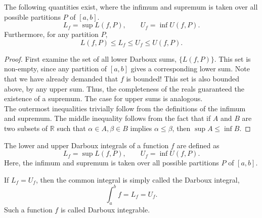 \documentclass[11pt]{article}
\def\R{\mathbb{R}}
\theoremstyle{definition}
\theoremstyle{remark}
\numberwithin{equation}{module}
\begin{document}
    \begin{corollary}
        The following quantities exist, where the infimum and supremum is taken over
        all possible partitions $P$ of $[a, b]$. \[
            L_f = \sup L(f, P), \qquad U_f = \inf U(f, P).
        \] Furthermore, for any partition $P$, \[
            L(f, P) \leq L_f \leq U_f \leq U(f, P).
        \] 
    \end{corollary}
    \begin{proof}
        First examine the set of all lower Darboux sums, $\{L(f, P)\}$. This set is
        non-empty, since any partition of $[a, b]$ gives a corresponding lower sum.
        Note that we have already demanded that $f$ is bounded!
        This set is also bounded above, by any upper sum. Thus, the completeness of
        the reals guaranteed the existence of a supremum. The case for upper sums is
        analogous. \\

        \noindent The outermost inequalities trivially follow from the definitions
        of the infimum and supremum. The middle inequality follows from the fact
        that if $A$ and $B$ are two subsets of $\R$ such that $\alpha \in A, \beta
        \in B$ implies $\alpha \leq \beta$, then $\sup{A} \leq \inf{B}$.
    \end{proof}
    
    \begin{definition}
        The lower and upper Darboux integrals of a function $f$ are defined as \[
            L_f = \sup L(f, P), \qquad U_f = \inf U(f, P).
        \] Here, the infimum and supremum is taken over all possible partitions $P$
        of $[a, b]$.

        If $L_f = U_f$, then the common integral is simply called the Darboux
        integral, \[
            \int_a^b f = L_f = U_f.
        \] Such a function $f$ is called Darboux integrable.
    \end{definition}
    
\end{document}
